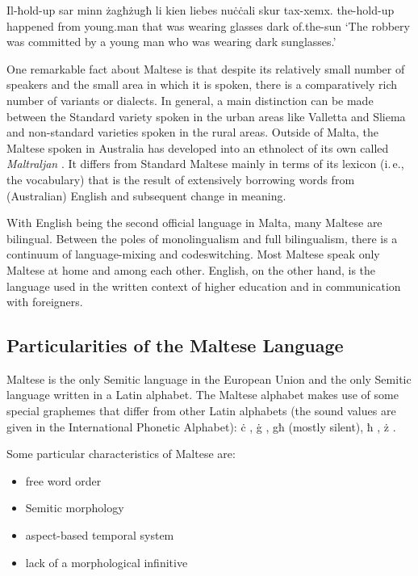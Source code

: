 \documentclass[]{../../metanetpaper}
\begin{document}
\begin{multicols}{2}
\begin{examples}
\item
\gll Il-ħold-up sar minn żagħżugħ li kien liebes nuċċali skur tax-xemx.
the-hold-up happened from young.man that was wearing glasses dark of.the-sun
\glt `The robbery was committed by a young man who was wearing dark sunglasses.'
\glend
\end{examples}

One remarkable fact about Maltese is that despite its relatively small number of speakers and the small area in which it is spoken, there is a comparatively rich number of variants or dialects. In general, a main distinction can be made between the Standard variety spoken in the urban areas like Valletta and Sliema and non-standard varieties spoken in the rural areas. Outside of Malta, the Maltese spoken in Australia has developed into an ethnolect of its own called \emph{Maltraljan}  \cite{Bovingdon:2001}. It differs from Standard Maltese mainly in terms of its lexicon (i.\,e., the vocabulary) that is the result of extensively borrowing words from (Australian) English and subsequent change in meaning. 

With English being the second official language in Malta, many Maltese are bilingual. Between the poles of monolingualism and full bilingualism, there is a continuum of language-mixing and codeswitching. Most Maltese speak only Maltese at home and among each other. English, on the other hand, is the language used in the written context of higher education and in communication with foreigners. 

\subsection{Particularities of the Maltese Language}

Maltese is the only Semitic language in the European Union and the only Semitic language written in a Latin alphabet. The Maltese alphabet makes use of some special graphemes that differ from other Latin alphabets (the sound values are given in the International Phonetic Alphabet): ċ , ġ , għ (mostly silent), ħ , ż . \cite{Fabri:2011a,Borg-Alexander:1997}

Some particular characteristics of Maltese are:

\begin{itemize}
\item free word order 
\item Semitic morphology 
\item aspect-based temporal system
\item lack of a morphological infinitive
\end{itemize}


\end{multicols}
\end{document}
